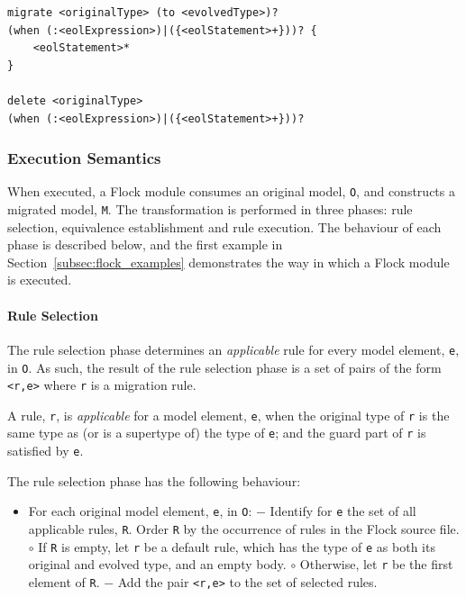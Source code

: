 \begin{lstlisting}[float=tbp, caption=Concrete syntax of migrate and delete rules., label=lst:flock_concrete_syntax, language=Flock]
migrate <originalType> (to <evolvedType>)?
(when (:<eolExpression>)|({<eolStatement>+}))? {
	<eolStatement>*
} 

delete <originalType>
(when (:<eolExpression>)|({<eolStatement>+}))?
\end{lstlisting}

\subsubsection{Execution Semantics}
\label{subsubsec:execution_semantics}
When executed, a Flock module consumes an original model, \texttt{O}, and constructs a migrated model, \texttt{M}. The transformation is performed in three phases: rule selection, equivalence establishment and rule execution. The behaviour of each phase is described below, and the first example in Section~\ref{subsec:flock_examples} demonstrates the way in which a Flock module is executed.

\paragraph{Rule Selection}
The rule selection phase determines an \emph{applicable} rule for every model element, \texttt{e}, in \texttt{O}. As such, the result of the rule selection phase is a set of pairs of the form \texttt{<r,e>} where \texttt{r} is a migration rule.

A rule, \texttt{r}, is \emph{applicable} for a model element, \texttt{e}, when the original type of \texttt{r} is the same type as (or is a supertype of) the type of \texttt{e}; and the guard part of \texttt{r} is satisfied by \texttt{e}.

The rule selection phase has the following behaviour:

\begin{itemize}
	\item For each original model element, \texttt{e}, in \texttt{O}:
	\subitem $-$ Identify for \texttt{e} the set of all applicable rules, \texttt{R}. Order \texttt{R} by the occurrence of rules in the Flock source file.
	\subsubitem $\circ$ If \texttt{R} is empty, let \texttt{r} be a default rule, which has the type of \texttt{e} as both its original and evolved type, and an empty body.
	\subsubitem $\circ$ Otherwise, let \texttt{r} be the first element of \texttt{R}.
	\subitem $-$ Add the pair \texttt{<r,e>} to the set of selected rules.
\end{itemize}

